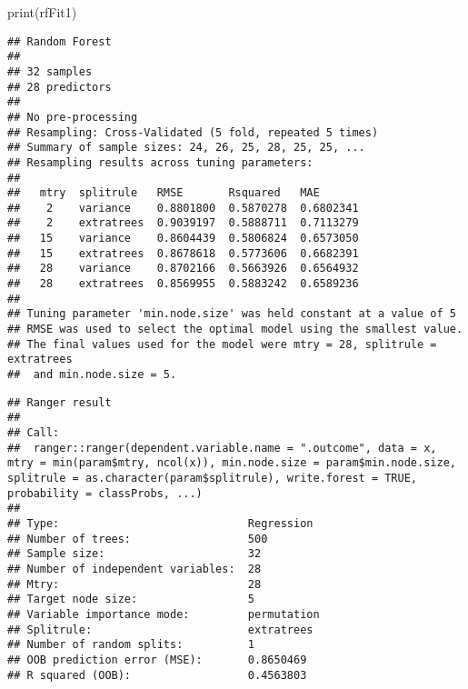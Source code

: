 \documentclass[
  oneside]{book}
\newenvironment{Shaded}{\begin{snugshade}}{\end{snugshade}}
\newcommand{\FunctionTok}[1]{\textcolor[rgb]{0.00,0.00,0.00}{#1}}
\newcommand{\NormalTok}[1]{#1}
\newcommand{\SpecialCharTok}[1]{\textcolor[rgb]{0.00,0.00,0.00}{#1}}
\begin{document}
\begin{Shaded}
\begin{Highlighting}[]
\FunctionTok{print}\NormalTok{(rfFit1)}
\end{Highlighting}
\end{Shaded}

\begin{verbatim}
## Random Forest 
## 
## 32 samples
## 28 predictors
## 
## No pre-processing
## Resampling: Cross-Validated (5 fold, repeated 5 times) 
## Summary of sample sizes: 24, 26, 25, 28, 25, 25, ... 
## Resampling results across tuning parameters:
## 
##   mtry  splitrule   RMSE       Rsquared   MAE      
##    2    variance    0.8801800  0.5870278  0.6802341
##    2    extratrees  0.9039197  0.5888711  0.7113279
##   15    variance    0.8604439  0.5806824  0.6573050
##   15    extratrees  0.8678618  0.5773606  0.6682391
##   28    variance    0.8702166  0.5663926  0.6564932
##   28    extratrees  0.8569955  0.5883242  0.6589236
## 
## Tuning parameter 'min.node.size' was held constant at a value of 5
## RMSE was used to select the optimal model using the smallest value.
## The final values used for the model were mtry = 28, splitrule = extratrees
##  and min.node.size = 5.
\end{verbatim}

\begin{Shaded}
\end{Shaded}

\begin{verbatim}
## Ranger result
## 
## Call:
##  ranger::ranger(dependent.variable.name = ".outcome", data = x,      mtry = min(param$mtry, ncol(x)), min.node.size = param$min.node.size,      splitrule = as.character(param$splitrule), write.forest = TRUE,      probability = classProbs, ...) 
## 
## Type:                             Regression 
## Number of trees:                  500 
## Sample size:                      32 
## Number of independent variables:  28 
## Mtry:                             28 
## Target node size:                 5 
## Variable importance mode:         permutation 
## Splitrule:                        extratrees 
## Number of random splits:          1 
## OOB prediction error (MSE):       0.8650469 
## R squared (OOB):                  0.4563803
\end{verbatim}
\end{document}
